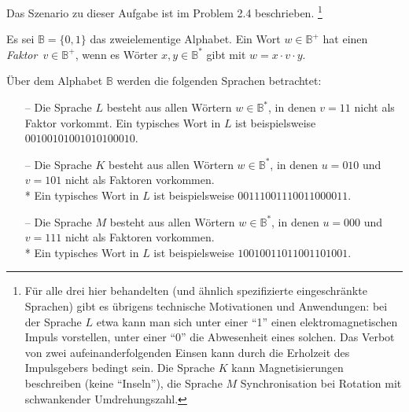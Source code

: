 Das Szenario zu dieser Aufgabe ist im Problem 2.4 beschrieben.
\footnote{
Für alle drei hier behandelten (und ähnlich spezifizierte eingeschränkte
Sprachen) gibt es übrigens technische Motivationen und Anwendungen: bei der
Sprache $L$ etwa kann man sich unter einer ``1'' einen elektromagnetischen
Impuls vorstellen, unter einer ``0'' die Abwesenheit eines solchen. Das Verbot
von zwei aufeinanderfolgenden Einsen kann durch die Erholzeit des Impulsgebers
bedingt sein. Die Sprache $K$ kann Magnetisierungen beschreiben (keine
``Inseln''), die Sprache $M$ Synchronisation bei Rotation mit schwankender
Umdrehungszahl.
}

Es sei $\mathbb{B} = \{0,1\}$ das zweielementige Alphabet. Ein Wort $w \in
\mathbb{B}^+$ hat einen \emph{Faktor}~$v \in \mathbb{B}^+$, wenn es Wörter
$x,y \in \mathbb{B}^*$ gibt mit $w=x \cdot v \cdot y$.

Über dem Alphabet $\mathbb{B}$ werden die folgenden Sprachen betrachtet:
\begin{itemize}
\item[--] Die Sprache $L$ besteht aus allen Wörtern $w \in \mathbb{B}^*$, in
	denen $v=11$ nicht als Faktor vorkommt. Ein typisches Wort in $L$ ist
	beispielsweise $00100101001010100010$.

\item[--] Die Sprache $K$ besteht aus allen Wörtern $w \in \mathbb{B}^*$, in
	denen $u=010$ und $v=101$ nicht als Faktoren vorkommen.\\* Ein
	typisches Wort in $L$ ist beispielsweise $00111001110011000011$.

\item[--] Die Sprache $M$ besteht aus allen Wörtern $w \in \mathbb{B}^*$, in
	denen $u=000$ und $v=111$ nicht als Faktoren vorkommen.\\* Ein
	typisches Wort in $L$ ist beispielsweise $10010011011001101001$.
\end{itemize}

